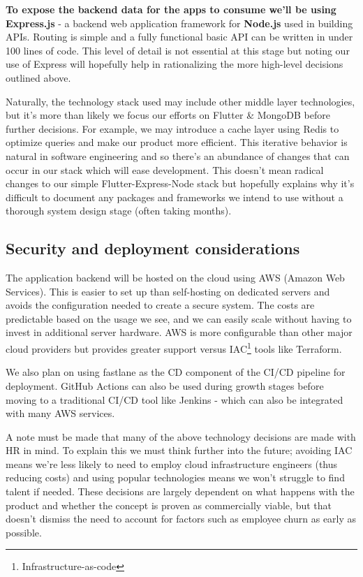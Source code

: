\textbf{To expose the backend data for the apps to consume 
we'll be using Express.js} - a backend web application
framework for \textbf{Node.js} used in building APIs. Routing is simple and a fully functional
basic API can be written in under 100 lines of code. This level of detail
is not essential at this stage but noting our use of Express will hopefully
help in rationalizing the more high-level decisions outlined above.
\par
Naturally, the technology stack used may include other middle layer
technologies, but it's more than likely we focus our efforts on
Flutter \& MongoDB before further decisions.
For example, we may introduce a cache layer using Redis to optimize
queries and make our product more efficient. This iterative behavior is natural in 
software engineering and so there's an abundance of changes that can occur in our stack which will ease
development. This doesn't mean radical changes to our simple Flutter-Express-Node stack
but hopefully explains why it's difficult to document any packages and frameworks
we intend to use without a thorough system design stage (often taking months).
\vspace{-5mm}
\subsection{Security and deployment considerations}
The application backend will be hosted on the cloud using
AWS (Amazon Web Services). This is easier to set up than
self-hosting on dedicated servers and avoids the configuration needed to create
a secure system. The costs are predictable based on the usage we see, and
we can easily scale without having to invest in additional server hardware.
AWS is more configurable than other major cloud providers
but provides greater support versus IAC\footnote{Infrastructure-as-code}
tools like Terraform.
\par
We also plan on using fastlane as the CD component of the CI/CD pipeline for deployment.
GitHub Actions can also be used during growth stages before moving to a traditional
CI/CD tool like Jenkins - which can also be integrated with many AWS services. 
\par
A note must be made that many of the above technology decisions are made with HR in mind.
To explain this we must think further into the future; avoiding IAC means we're less likely
to need to employ cloud infrastructure engineers (thus reducing costs) and using popular technologies means
we won't struggle to find talent if needed. These decisions 
are largely dependent on what happens with the product and whether the concept
is proven as commercially viable, but that doesn't dismiss the need to account for factors
such as employee churn as early as possible.
